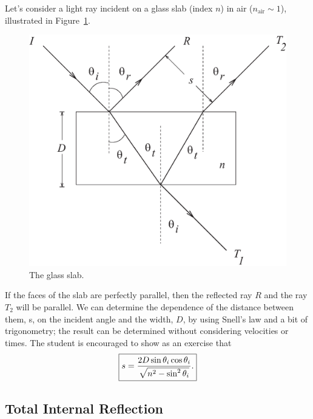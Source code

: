 Let's consider a light ray incident on a glass slab (index $n$) in air 
($n_{\mbox{air}}\sim 1$), illustrated in Figure~\ref{fig:opt:slab}.
\begin{figure}[htb]
\centering 
\epsfxsize=10cm \includegraphics[scale=0.6]{8_refraction/slab.eps}
\caption{The glass slab.}
\label{fig:opt:slab}
\end{figure}
If the faces of the slab are perfectly parallel, then the reflected ray $R$ 
and the ray $T_2$ will be parallel. We can determine the dependence of the 
distance between them, s, on the incident angle and the width, $D$, by 
using Snell's law and a bit of trigonometry;  the result can be determined 
without considering velocities or times. The student is encouraged to show as 
an exercise that
\begin{equation}
\fbox{$ \displaystyle s =\frac{2D\sin\theta_i\cos\theta_i}{\sqrt{n^2-\sin^2\theta_i}}. $}
\label{eq:opt:slab}
\end{equation}

\subsection{Total Internal Reflection}
\label{sec:opt:totintref}


